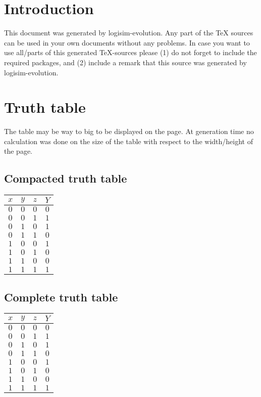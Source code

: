 \documentclass [15pt,a4paper,twoside]{article}
\begin{document}
\section{Introduction}
This document was generated by logisim-evolution. Any part of the TeX sources can be used in your own documents without any problems. In case you want to use all/parts of this generated TeX-sources please (1) do not forget to include the required packages, and (2) include a remark that this source was generated by logisim-evolution.
\section{Truth table}
The table may be way to big to be displayed on the page. At generation time no calculation was done on the size of the table with respect to the width/height of the page.
\subsection{Compacted truth table}
\begin{center}
\begin{tabular}{ccc|c}
$x$&$y$&$z$&$Y$\\
\hline
$0$&$0$&$0$&$0$\\
$0$&$0$&$1$&$1$\\
$0$&$1$&$0$&$1$\\
$0$&$1$&$1$&$0$\\
$1$&$0$&$0$&$1$\\
$1$&$0$&$1$&$0$\\
$1$&$1$&$0$&$0$\\
$1$&$1$&$1$&$1$\\

\end{tabular}
\end{center}
\subsection{Complete truth table}
\begin{center}
\begin{tabular}{ccc|c}
$x$&$y$&$z$&$Y$\\
\hline
$0$&$0$&$0$&$0$\\
$0$&$0$&$1$&$1$\\
$0$&$1$&$0$&$1$\\
$0$&$1$&$1$&$0$\\
$1$&$0$&$0$&$1$\\
$1$&$0$&$1$&$0$\\
$1$&$1$&$0$&$0$\\
$1$&$1$&$1$&$1$\\

\end{tabular}
\end{center}
\end{document}
